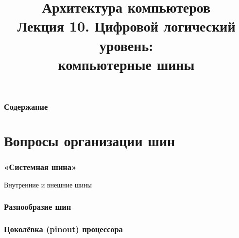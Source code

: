 \newcommand{\h}{%
handout,%
}



\title[Компьютерные шины]{Архитектура компьютеров\texorpdfstring{\\}{ }Лекция 10. Цифровой логический уровень:\texorpdfstring{\\}{ }компьютерные шины}




\begin{frame}
\titlepage
\end{frame}

\begin{frame}
\frametitle{Содержание}
\tableofcontents
\end{frame}


\section{Вопросы организации шин}

\begin{frame}
\frametitle{«Системная шина»}

\pause Внутренние и внешние шины
\end{frame}

\begin{frame}[plain]
\frametitle{Разнообразие шин}
\end{frame}

\begin{frame}
\frametitle{Цоколёвка (pinout) процессора}
\end{frame}


